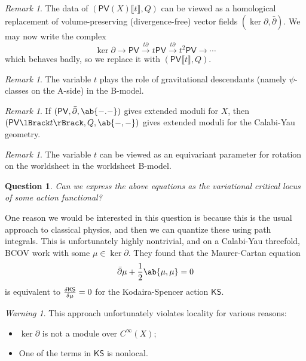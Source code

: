 \documentclass[article,10pt,oneside,oldfontcommands]{memoir}
\newtheorem{quest}[thm]{Question}
\theoremstyle{definition}
\theoremstyle{remark}
\newtheorem{rmk}[thm]{Remark}
\newtheorem{warn}[thm]{Warning}
\theoremstyle{plain}
\theoremstyle{definition}
\theoremstyle{remark}
\newcommand{\ms}[1]{\mathsf{#1}}
\newcommand{\1}{\mathbf{1}}
\newcommand{\2}{\mathbf{2}}
\newcommand{\3}{\mathbf{3}}
\newcommand{\ps}[1]{\lBrack #1 \rBrack}
\newcommand{\dbar}{\bar{\partial}}
\begin{document}
\begin{rmk}
    The data of \((\ms{PV}(X) \ps{t}, Q)\) can be viewed as a homological replacement of volume-preserving (divergence-free) vector fields \((\ker \partial, \dbar)\). We may now write the complex
    \[ \ker \partial \to \ms{PV} \xrightarrow{t \partial} t \ms{PV} \xrightarrow{t \partial} t^2 \ms{PV} \to \cdots \]
    which behaves badly, so we replace it with \((\ms{PV} \ps{t}, Q)\).
\end{rmk}

\begin{rmk}
    The variable \(t\) plays the role of gravitational descendants (namely \(\psi\)-classes on the A-side) in the B-model.
\end{rmk}

\begin{rmk}
    If \((\ms{PV}, \dbar, \ab\{-.-\})\) gives extended moduli for \(X\), then \((\ms{PV} \ps{t}, Q, \ab\{-,-\})\) gives extended moduli for the Calabi-Yau geometry.
\end{rmk}

\begin{rmk}
    The variable \(t\) can be viewed as an equivariant parameter for rotation on the worldsheet in the worldsheet B-model.
\end{rmk}

\begin{quest}
    Can we express the above equations as the variational critical locus of some action functional?
\end{quest}

One reason we would be interested in this question is because this is the usual approach to classical physics, and then we can quantize these using path integrals. This is unfortunately highly nontrivial, and on a Calabi-Yau threefold, BCOV work with some \(\mu \in \ker \partial\). They found that the Maurer-Cartan equation
\[ \dbar \mu + \frac{1}{2} \ab\{\mu, \mu\} = 0 \]
is equivalent to \(\fdv{\ms{KS}}{\mu} = 0\) for the Kodaira-Spencer action \(\ms{KS}\).

\begin{warn}
    This approach unfortunately violates locality for various reasons:
    \begin{itemize}
        \item \(\ker \partial\) is not a module over \(C^{\infty}(X)\);
        \item One of the terms in \(\ms{KS}\) is nonlocal.
    \end{itemize}
\end{warn}
\end{document}
